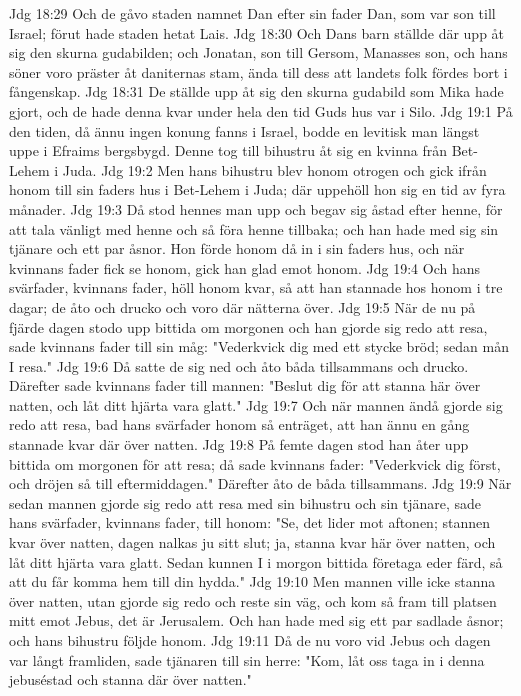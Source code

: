 Jdg 18:29  Och de gåvo staden namnet Dan efter sin fader Dan, som var son till Israel; förut hade staden hetat Lais.
Jdg 18:30  Och Dans barn ställde där upp åt sig den skurna gudabilden; och Jonatan, son till Gersom, Manasses son, och hans söner voro präster åt daniternas stam, ända till dess att landets folk fördes bort i fångenskap.
Jdg 18:31  De ställde upp åt sig den skurna gudabild som Mika hade gjort, och de hade denna kvar under hela den tid Guds hus var i Silo.
Jdg 19:1  På den tiden, då ännu ingen konung fanns i Israel, bodde en levitisk man längst uppe i Efraims bergsbygd. Denne tog till bihustru åt sig en kvinna från Bet-Lehem i Juda.
Jdg 19:2  Men hans bihustru blev honom otrogen och gick ifrån honom till sin faders hus i Bet-Lehem i Juda; där uppehöll hon sig en tid av fyra månader.
Jdg 19:3  Då stod hennes man upp och begav sig åstad efter henne, för att tala vänligt med henne och så föra henne tillbaka; och han hade med sig sin tjänare och ett par åsnor. Hon förde honom då in i sin faders hus, och när kvinnans fader fick se honom, gick han glad emot honom.
Jdg 19:4  Och hans svärfader, kvinnans fader, höll honom kvar, så att han stannade hos honom i tre dagar; de åto och drucko och voro där nätterna över.
Jdg 19:5  När de nu på fjärde dagen stodo upp bittida om morgonen och han gjorde sig redo att resa, sade kvinnans fader till sin måg: "Vederkvick dig med ett stycke bröd; sedan mån I resa."
Jdg 19:6  Då satte de sig ned och åto båda tillsammans och drucko. Därefter sade kvinnans fader till mannen: "Beslut dig för att stanna här över natten, och låt ditt hjärta vara glatt."
Jdg 19:7  Och när mannen ändå gjorde sig redo att resa, bad hans svärfader honom så enträget, att han ännu en gång stannade kvar där över natten.
Jdg 19:8  På femte dagen stod han åter upp bittida om morgonen för att resa; då sade kvinnans fader: "Vederkvick dig först, och dröjen så till eftermiddagen." Därefter åto de båda tillsammans.
Jdg 19:9  När sedan mannen gjorde sig redo att resa med sin bihustru och sin tjänare, sade hans svärfader, kvinnans fader, till honom: "Se, det lider mot aftonen; stannen kvar över natten, dagen nalkas ju sitt slut; ja, stanna kvar här över natten, och låt ditt hjärta vara glatt. Sedan kunnen I i morgon bittida företaga eder färd, så att du får komma hem till din hydda."
Jdg 19:10  Men mannen ville icke stanna över natten, utan gjorde sig redo och reste sin väg, och kom så fram till platsen mitt emot Jebus, det är Jerusalem. Och han hade med sig ett par sadlade åsnor; och hans bihustru följde honom.
Jdg 19:11  Då de nu voro vid Jebus och dagen var långt framliden, sade tjänaren till sin herre: "Kom, låt oss taga in i denna jebuséstad och stanna där över natten."
